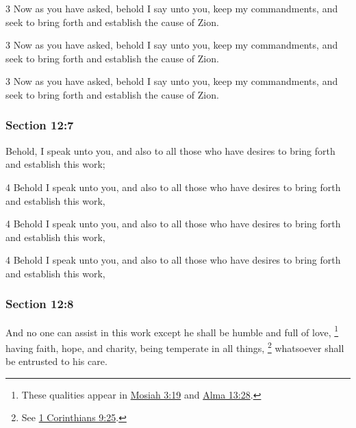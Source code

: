 		\begin{framed}
		\scriptsize
			\begin{compactdesc}
				\item[JSP] 3 Now as you have asked, behold I say unto you, keep my commandments, and seek to bring forth and establish the cause of Zion.
				\item[DC 1835] 3 Now as you have asked, behold I say unto you, keep my commandments, and seek to bring forth and establish the cause of Zion.
				\item[DC 1844] 3 Now as you have asked, behold I say unto you, keep my commandments, and seek to bring forth and establish the cause of Zion.
			\end{compactdesc}
		\end{framed}

	\subsubsection{Section 12:7} %
		\label{DC12-7}

		Behold, I speak unto you, and also to all those who have desires to bring forth and establish this work;

		\begin{framed}
		\scriptsize
			\begin{compactdesc}
				\item[JSP] 4 Behold I speak unto you, and also to all those who have desires to bring forth and establish this work, 
				\item[DC 1835] 4 Behold I speak unto you, and also to all those who have desires to bring forth and establish this work,
				\item[DC 1844] 4 Behold I speak unto you, and also to all those who have desires to bring forth and establish this work, 
			\end{compactdesc}
		\end{framed}

	\subsubsection{Section 12:8} %
		\label{DC12-8}

		And no one can assist in this work except he shall be humble and full of love,%
			\footnote{%
				These qualities appear in \hyperref[MOSIAH-3-19]{Mosiah 3:19} and \hyperref[ALMA-13-28]{Alma 13:28}.
				}
		having faith, hope, and charity, being temperate in all things,%
			\footnote{%
				See \hyperref[1CORINTHIANS-9-25]{1 Corinthians 9:25}.
				}
		whatsoever shall be entrusted to his care.

